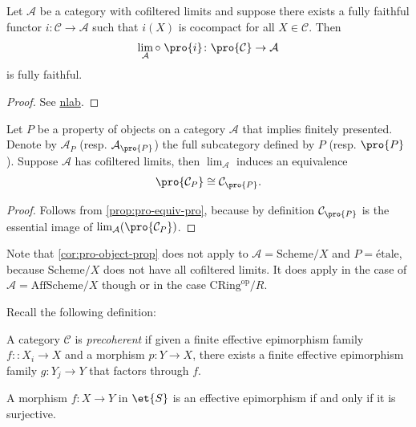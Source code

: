 \begin{proposition}
    Let $\mathcal{A}$ be a category with cofiltered limits and suppose there exists
    a fully faithful functor $i\colon \mathcal{C} \to \mathcal{A}$ such that
    $i(X)$ is cocompact for all $X \in \mathcal{C}$. Then
    \[
        \lim_{\mathcal{A}} \circ \; \pro{i}\colon \pro{\mathcal{C}} \to \mathcal{A}
    \] is fully faithful.
    \label{prop:pro-equiv-pro}
\end{proposition}

\begin{proof}
    See \href{https://ncatlab.org/nlab/show/pro-object#PropositionCategoriesEquivalentToProC}{nlab}.
\end{proof}

\begin{corollary}
    Let $P$ be a property of objects on a category $\mathcal{A}$ that implies finitely presented.
    Denote by $\mathcal{A}_P$ (resp. $\mathcal{A}_{\pro{P}}$) the full subcategory defined by $P$
    (resp. $\pro{P}$). Suppose $\mathcal{A}$ has cofiltered limits, then $\lim_{\mathcal{A}}$
    induces an equivalence
    \[
        \pro{\mathcal{C}_{P}} \cong \mathcal{C}_{\pro{P}}
    .\]
    \label{cor:pro-object-prop}
\end{corollary}

\begin{proof}
    Follows from \ref{prop:pro-equiv-pro}, because by definition $\mathcal{C}_{\pro{P}}$ is
    the essential image of $\lim_{\mathcal{A}}(\pro{\mathcal{C}_{P}})$.
\end{proof}

Note that \ref{cor:pro-object-prop} does not apply to $\mathcal{A} = \mathrm{Scheme} / X$
and $P = \mathrm{étale}$, because $\mathrm{Scheme} / X$ does not have all cofiltered limits. It
does apply in the case of $\mathcal{A} = \mathrm{AffScheme} / X$ though or in the case
$\mathrm{CRing}^{\mathrm{op}} / R$.

Recall the following definition:

\begin{definition}
    A category $\mathcal{C}$ is \emph{precoherent} if given a finite effective epimorphism family
    $f\colon \colon X_i \to X$ and a morphism $p\colon Y \to X$, there exists a finite effective epimorphism family
    $g\colon Y_j \to Y$ that factors through $f$.
\end{definition}

\begin{lemma}
    A morphism $f\colon X \to Y$ in $\et{S}$ is an effective epimorphism if and only if
    it is surjective.
    \label{lemma:et-effective-epi}
    \leanok
\end{lemma}

